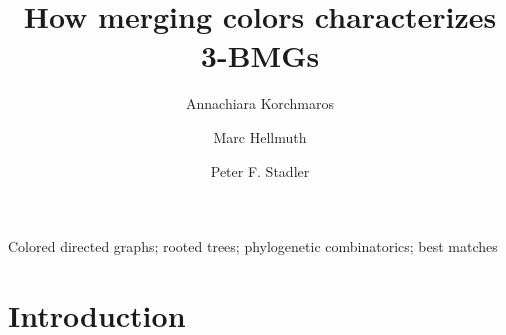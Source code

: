 \documentclass[final,3p,times]{elsarticle}
\begin{document}
\begin{frontmatter}
  \title{How merging colors characterizes 3-BMGs}

  \author[LEI]{Annachiara Korchmaros}

  \author[STOCK]{Marc Hellmuth}

  \author[LEI,LEI-other,MIS,TBI,BOG,SFI]{Peter F. Stadler}

\address[LEI]{Bioinformatics Group, Department of Computer Science \&
  Interdisciplinary Center for Bioinformatics, Universit{\"a}t Leipzig,
  H{\"a}rtelstra{\ss}e 16-18, D-04107 Leipzig, Germany}

\address[STOCK]{Department of Mathematics, Faculty of Science,
Stockholm University, SE-10691 Stockholm, Sweden}

\address[LEI-other]{German Centre for Integrative Biodiversity Research
  (iDiv) Halle-Jena-Leipzig, Competence Center for Scalable Data Services
  and Solutions Dresden-Leipzig, Leipzig Research Center for Civilization
  Diseases, and Centre for Biotechnology and Biomedicine at Leipzig
  University at Universit{\"a}t Leipzig}

\address[MIS]{Max Planck Institute for Mathematics in the Sciences,
  Inselstra{\ss}e 22, D-04103 Leipzig, Germany}

\address[TBI]{Institute for Theoretical Chemistry, University of Vienna,
  W{\"a}hringerstrasse 17, A-1090 Wien, Austria}

\address[BOG]{Facultad de Ciencias, Universidad National de Colombia, Sede
  Bogot{\'a}, Colombia}

\address[SFI]{Santa Fe Institute, 1399 Hyde Park Rd., Santa Fe NM 87501,
  USA}


\begin{abstract}
  
\end{abstract}


\begin{keyword}
 Colored directed graphs; rooted trees; phylogenetic
  combinatorics; best matches
\end{keyword}

\end{frontmatter}

\sloppy

\section{Introduction}
\end{document}
